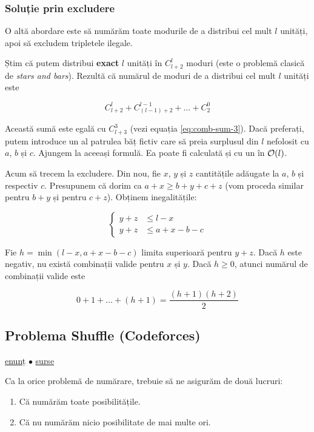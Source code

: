 \documentclass[../main.tex]{subfiles}
\begin{document}
\subsubsection*{Soluție prin excludere}

O altă abordare este să numărăm toate modurile de a distribui cel mult $l$ unități, apoi să excludem tripletele ilegale.

Știm că putem distribui \textbf{exact} $l$ unități în $C_{l+2}^l$ moduri (este o problemă clasică de \textit{stars and bars}). Rezultă că numărul de moduri de a distribui cel mult $l$ unități este

$$C_{l+2}^{l} + C_{(l-1)+2}^{l-1} + \dots + C_2^0$$

Această sumă este egală cu $C_{l + 3}^{3}$ (vezi equația \ref{eq:comb-sum-3}). Dacă preferați, putem introduce un al patrulea băț fictiv care să preia surplusul din $l$ nefolosit cu $a$, $b$ și $c$. Ajungem la aceeași formulă. Ea poate fi calculată și cu un  în $\mathcal{O}(l)$.

Acum să trecem la excludere. Din nou, fie $x$, $y$ și $z$ cantitățile adăugate la $a$, $b$ și respectiv $c$. Presupunem că dorim ca $a+x \geq b + y + c + z$ (vom proceda similar pentru $b+y$ și pentru $c+z$). Obținem inegalitățile:

$$
\begin{cases}
y + z & \leq l - x\\
y + z & \leq a + x - b - c
\end{cases}
$$

Fie $h = \min(l - x, a + x - b - c)$ limita superioară pentru $y+z$. Dacă $h$ este negativ, nu există combinații valide pentru $x$ și $y$. Dacă $h \geq 0$, atunci numărul de combinații valide este

$$0 + 1 + \dots + (h + 1) = \frac{(h + 1)(h + 2)}{2}$$

\subsection{Problema Shuffle (Codeforces)}
\label{problem:shuffle}

\href{https://codeforces.com/contest/1622/problem/D}{enunț}
$\bullet$
\hyperref[code:shuffle]{surse}

Ca la orice problemă de numărare, trebuie să ne asigurăm de două lucruri:

\begin{enumerate}
  \item Că numărăm toate posibilitățile.

  \item Că nu numărăm nicio posibilitate de mai multe ori.
\end{enumerate}
\end{document}

